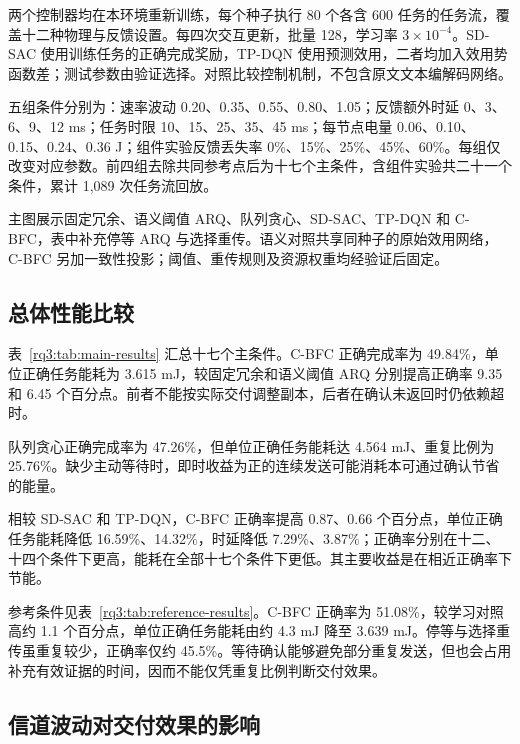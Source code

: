 两个控制器均在本环境重新训练，每个种子执行 80 个各含 600 任务的任务流，覆盖十二种物理与反馈设置。每四次交互更新，批量 128，学习率 $3\times10^{-4}$。SD-SAC 使用训练任务的正确完成奖励，TP-DQN 使用预测效用，二者均加入效用势函数差；测试参数由验证选择。对照比较控制机制，不包含原文文本编解码网络。

五组条件分别为：速率波动 0.20、0.35、0.55、0.80、1.05；反馈额外时延 0、3、6、9、12 ms；任务时限 10、15、25、35、45 ms；每节点电量 0.06、0.10、0.15、0.24、0.36 J；组件实验反馈丢失率 0\%、15\%、25\%、45\%、60\%。每组仅改变对应参数。前四组去除共同参考点后为十七个主条件，含组件实验共二十一个条件，累计 1,089 次任务流回放。

主图展示固定冗余、语义阈值 ARQ、队列贪心、SD-SAC、TP-DQN 和 C-BFC，表中补充停等 ARQ 与选择重传。语义对照共享同种子的原始效用网络，C-BFC 另加一致性投影；阈值、重传规则及资源权重均经验证后固定。

\subsection{总体性能比较}
\label{rq3:subsec:overall-results}

表~\ref{rq3:tab:main-results} 汇总十七个主条件。C-BFC 正确完成率为 49.84\%，单位正确任务能耗为 3.615 mJ，较固定冗余和语义阈值 ARQ 分别提高正确率 9.35 和 6.45 个百分点。前者不能按实际交付调整副本，后者在确认未返回时仍依赖超时。



队列贪心正确完成率为 47.26\%，但单位正确任务能耗达 4.564 mJ、重复比例为 25.76\%。缺少主动等待时，即时收益为正的连续发送可能消耗本可通过确认节省的能量。

相较 SD-SAC 和 TP-DQN，C-BFC 正确率提高 0.87、0.66 个百分点，单位正确任务能耗降低 16.59\%、14.32\%，时延降低 7.29\%、3.87\%；正确率分别在十二、十四个条件下更高，能耗在全部十七个条件下更低。其主要收益是在相近正确率下节能。



参考条件见表~\ref{rq3:tab:reference-results}。C-BFC 正确率为 51.08\%，较学习对照高约 1.1 个百分点，单位正确任务能耗由约 4.3 mJ 降至 3.639 mJ。停等与选择重传虽重复较少，正确率仅约 45.5\%。等待确认能够避免部分重复发送，但也会占用补充有效证据的时间，因而不能仅凭重复比例判断交付效果。

\FloatBarrier
\subsection{信道波动对交付效果的影响}
\label{rq3:subsec:fading-results}

